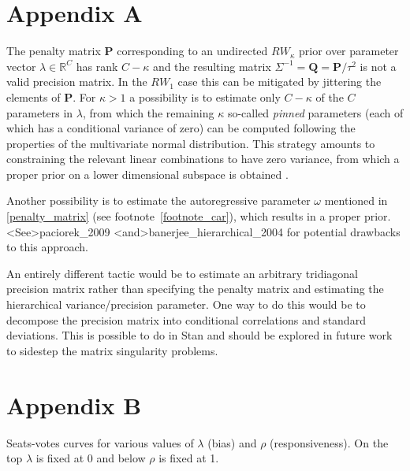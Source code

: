 

\chapter[Improper priors]{Appendix A} \label{AppendixA}

The penalty matrix $\mathbf{P}$ corresponding to an undirected $RW_\kappa$ prior over 
parameter vector $\lambda \in \mathbb{R}^C$ has rank $C - \kappa$ and the resulting 
matrix $\Sigma^{-1} = \mathbf{Q} = \mathbf{P}/\tau^2$ is not a valid precision matrix. In the 
$RW_1$ case this can be mitigated by jittering the elements of $\mathbf{P}$. For $\kappa > 1$ 
a possibility is to estimate only $C - \kappa$ of the $C$ parameters in $\lambda$,  from 
which the remaining $\kappa$ so-called {\it pinned} parameters (each of which has a 
conditional variance of zero) can be computed following the properties of the multivariate 
normal distribution. This strategy amounts to  constraining the relevant linear combinations 
to have zero variance, from which a proper prior on a lower dimensional subspace is 
obtained . 

Another possibility is to estimate the autoregressive parameter $\omega$ mentioned 
in \ref{penalty_matrix} (see footnote~\ref{footnote_car}), which results in a proper prior.
\citeA<See>{paciorek_2009} \citeA<and>{banerjee_hierarchical_2004} for potential
drawbacks to this approach.

An entirely different tactic would be to estimate an arbitrary tridiagonal precision matrix 
rather than specifying the penalty matrix and estimating the hierarchical variance/precision 
parameter. One way to do this would be to decompose the precision matrix into conditional 
correlations and standard deviations. This is possible to do in Stan and should be explored 
in future work to sidestep the matrix singularity problems. 


\clearpage
\chapter[Seats-votes curves]{Appendix B}\label{AppendixB}

Seats-votes curves for various values of $\lambda$ (bias) and $\rho$ (responsiveness). 
On the top $\lambda$ is fixed at 0 and below $\rho$ is fixed at 1.


